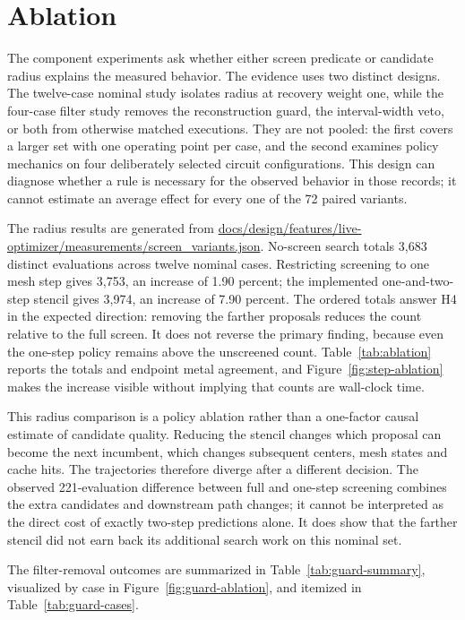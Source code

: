 \documentclass[10pt]{article}
\begin{document}
\section{Ablation}
The component experiments ask whether either screen predicate or candidate radius explains the measured behavior. The evidence uses two distinct designs. The twelve-case nominal study isolates radius at recovery weight one, while the four-case filter study removes the reconstruction guard, the interval-width veto, or both from otherwise matched executions. They are not pooled: the first covers a larger set with one operating point per case, and the second examines policy mechanics on four deliberately selected circuit configurations. This design can diagnose whether a rule is necessary for the observed behavior in those records; it cannot estimate an average effect for every one of the 72 paired variants.

The radius results are generated from \url{docs/design/features/live-optimizer/measurements/screen_variants.json}. No-screen search totals 3,683 distinct evaluations across twelve nominal cases. Restricting screening to one mesh step gives 3,753, an increase of 1.90 percent; the implemented one-and-two-step stencil gives 3,974, an increase of 7.90 percent. The ordered totals answer H4 in the expected direction: removing the farther proposals reduces the count relative to the full screen. It does not reverse the primary finding, because even the one-step policy remains above the unscreened count. Table~\ref{tab:ablation} reports the totals and endpoint metal agreement, and Figure~\ref{fig:step-ablation} makes the increase visible without implying that counts are wall-clock time.

This radius comparison is a policy ablation rather than a one-factor causal estimate of candidate quality. Reducing the stencil changes which proposal can become the next incumbent, which changes subsequent centers, mesh states and cache hits. The trajectories therefore diverge after a different decision. The observed 221-evaluation difference between full and one-step screening combines the extra candidates and downstream path changes; it cannot be interpreted as the direct cost of exactly two-step predictions alone. It does show that the farther stencil did not earn back its additional search work on this nominal set.

The filter-removal outcomes are summarized in Table~\ref{tab:guard-summary}, visualized by case in Figure~\ref{fig:guard-ablation}, and itemized in Table~\ref{tab:guard-cases}.
\end{document}
